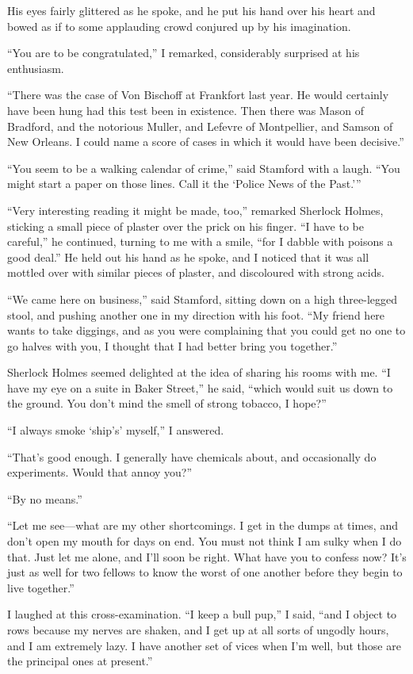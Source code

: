 \documentclass[12pt]{book}
\begin{document}
His eyes fairly glittered as he spoke, and he put his hand over his heart and bowed as if to some applauding crowd conjured up by his imagination. 

“You are to be congratulated,” I remarked, considerably surprised at his enthusiasm. 

“There was the case of Von Bischoff at Frankfort last year. He would certainly have been hung had this test been in existence. Then there was Mason of Bradford, and the notorious Muller, and Lefevre of Montpellier, and Samson of New Orleans. I could name a score of cases in which it would have been decisive.” 

“You seem to be a walking calendar of crime,” said Stamford with a laugh. “You might start a paper on those lines. Call it the ‘Police News of the Past.’” 

“Very interesting reading it might be made, too,” remarked Sherlock Holmes, sticking a small piece of plaster over the prick on his finger. “I have to be careful,” he continued, turning to me with a smile, “for I dabble with poisons a good deal.” He held out his hand as he spoke, and I noticed that it was all mottled over with similar pieces of plaster, and discoloured with strong acids. 

“We came here on business,” said Stamford, sitting down on a high three-legged stool, and pushing another one in my direction with his foot. “My friend here wants to take diggings, and as you were complaining that you could get no one to go halves with you, I thought that I had better bring you together.” 

Sherlock Holmes seemed delighted at the idea of sharing his rooms with me. “I have my eye on a suite in Baker Street,” he said, “which would suit us down to the ground. You don’t mind the smell of strong tobacco, I hope?” 

“I always smoke ‘ship’s’ myself,” I answered. 

“That’s good enough. I generally have chemicals about, and occasionally do experiments. Would that annoy you?” 

“By no means.” 

“Let me see—what are my other shortcomings. I get in the dumps at times, and don’t open my mouth for days on end. You must not think I am sulky when I do that. Just let me alone, and I’ll soon be right. What have you to confess now? It’s just as well for two fellows to know the worst of one another before they begin to live together.” 

I laughed at this cross-examination. “I keep a bull pup,” I said, “and I object to rows because my nerves are shaken, and I get up at all sorts of ungodly hours, and I am extremely lazy. I have another set of vices when I’m well, but those are the principal ones at present.” 
\end{document}
